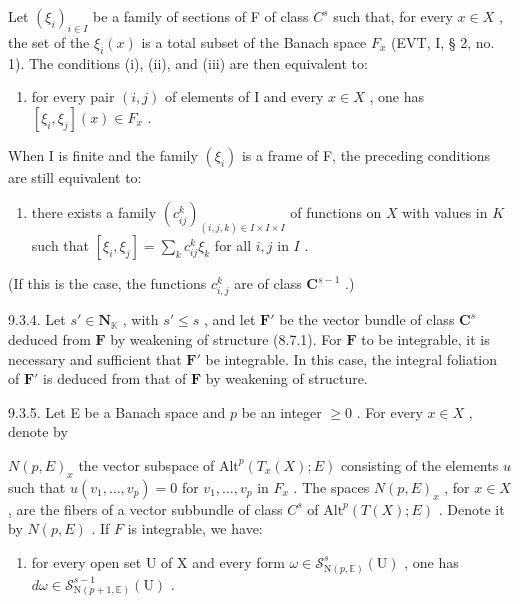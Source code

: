 Let \((\xi_{i})_{i\in I}\) be a family of sections of F of class \(C^{s}\) such that, for every \(x\in X\) , the set of the \(\xi_{i}(x)\) is a total subset of the Banach space \(F_{x}\) (EVT, I, § 2, no. 1). The conditions (i), (ii), and (iii) are then equivalent to:

\begin{enumerate}
\def\labelenumi{(\roman{enumi})}
\setcounter{enumi}{3}
\tightlist
\item
  for every pair \((i,j)\) of elements of I and every \(x\in X\) , one has \([\xi_i,\xi_j](x)\in F_x\) .
\end{enumerate}

When I is finite and the family \((\xi_{i})\) is a frame of F, the preceding conditions are still equivalent to:

\begin{enumerate}
\def\labelenumi{(\alph{enumi})}
\setcounter{enumi}{21}
\tightlist
\item
  there exists a family \((c_{ij}^{k})_{(i,j,k)\in I\times I\times I}\) of functions on \(X\) with values in \(K\) such that \([\xi_i,\xi_j] = \sum_{k}c_{ij}^k\xi_k\) for all \(i,j\) in \(I\) .
\end{enumerate}

(If this is the case, the functions \(c_{i,j}^{k}\) are of class \(\mathbf{C}^{s-1}\) .)

9.3.4. Let \(s' \in \mathbf{N}_{\mathbb{K}}\) , with \(s' \leqslant s\) , and let \(\mathbf{F}'\) be the vector bundle of class \(\mathbf{C}^{s}\) deduced from \(\mathbf{F}\) by weakening of structure (8.7.1). For \(\mathbf{F}\) to be integrable, it is necessary and sufficient that \(\mathbf{F}'\) be integrable. In this case, the integral foliation of \(\mathbf{F}'\) is deduced from that of \(\mathbf{F}\) by weakening of structure.

9.3.5. Let E be a Banach space and \(p\) be an integer \(\geqslant 0\) . For every \(x \in X\) , denote by

\(N(p, E)_{x}\) the vector subspace of \(\text{Alt}^{p}(T_{x}(X); E)\) consisting of the elements \(u\) such that \(u(v_{1}, \ldots, v_{p}) = 0\) for \(v_{1}, \ldots, v_{p}\) in \(F_{x}\) . The spaces \(N(p, E)_{x}\) , for \(x \in X\) , are the fibers of a vector subbundle of class \(C^{s}\) of \(\text{Alt}^{p}(T(X); E)\) . Denote it by \(N(p, E)\) . If \(F\) is integrable, we have:

\begin{enumerate}
\def\labelenumi{(\roman{enumi})}
\setcounter{enumi}{5}
\tightlist
\item
  for every open set U of X and every form \(\omega \in \mathcal{S}_{\mathrm{N}(p,\mathbb{E})}^s (\mathrm{U})\) , one has \(d\omega \in \mathcal{S}_{\mathrm{N}(p + 1,\mathbb{E})}^{s - 1}(\mathrm{U})\) .
\end{enumerate}

